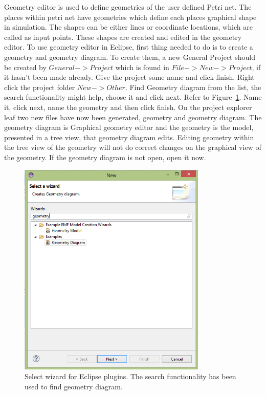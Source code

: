 Geometry editor is used to define geometries of the user defined Petri net. The places within petri net have geometries which define each places graphical shape in simulation. The shapes can be either lines or coordinate locations, which are called as input points. These shapes are created and edited in the geometry editor.
To use geometry editor in Eclipse, first thing needed to do is to create a geometry and geometry diagram. To create them, a new General Project should be created by $General->Project$ which is found in $File->New->Project$, if it hasn't been made already. Give the project some name and click finish. 
Right click the project folder $New->Other$. Find Geometry diagram from the list, the search functionality might help, choose it and click next. Refer to Figure~\ref{fig:ge-wiz-select}. Name it, click next, name the geometry and then click finish. On the project explorer leaf two new files have now been generated, geometry and geometry diagram. The geometry diagram is Graphical geometry editor and the geometry is the model, presented in a tree view, that geometry diagram edits. Editing geometry within the tree view of the geometry will not do correct changes on the graphical view of the geometry. If the geometry diagram is not open, open it now.

\begin{figure}[htp]
\begin{center}
  \includegraphics[width=0.8\textwidth]{image/ge-wiz-select.png}
  \caption{Select wizard for Eclipse plugins. The search functionality has been used to find geometry diagram.}
  \label{fig:ge-wiz-select}
\end{center}
\end{figure}

